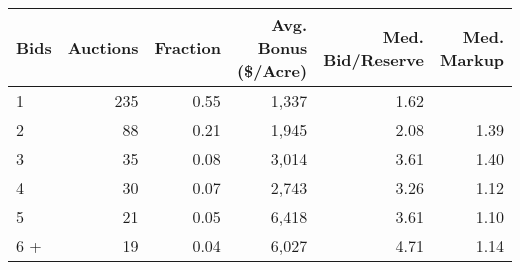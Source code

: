 
\begin{tabular}{lrrrrr}
\toprule
Bids & Auctions & Fraction & Avg. Bonus (\$/Acre) & Med. Bid/Reserve & Med. Markup\\
\midrule
1 & 235 & 0.55 & 1,337 & 1.62 & \\
2 & 88 & 0.21 & 1,945 & 2.08 & 1.39\\
3 & 35 & 0.08 & 3,014 & 3.61 & 1.40\\
4 & 30 & 0.07 & 2,743 & 3.26 & 1.12\\
5 & 21 & 0.05 & 6,418 & 3.61 & 1.10\\
6 + & 19 & 0.04 & 6,027 & 4.71 & 1.14\\
\bottomrule
\end{tabular}
